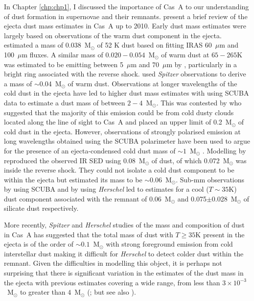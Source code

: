 In Chapter \ref{chp:chp1}, I discussed the importance of Cas~A to our understanding of dust formation in supernovae and their remnants.  \citet{Barlow2010} present a brief review of the ejecta dust mass estimates in Cas~A up to 2010.  Early dust mass estimates were largely based on observations of the warm dust component in the ejecta.  \citet{Arendt1999} estimated a mass of 0.038~M$_{\odot}$ of 52 K dust based on fitting IRAS 60~$\mu$m and 100~$\mu$m fluxes.  A similar mass of $0.020-0.054$~M$_{\odot}$ of warm dust at $65-265$K was estimated to be emitting between 5~$\mu$m and 70~$\mu$m by \citet{Rho2008}, particularly in a bright ring associated with the reverse shock.   \citet{Arendt2014} used {\em Spitzer} observations to derive a  mass of $\sim$0.04~M$_{\odot}$ of warm dust.  Observations at longer wavelengths of the cold dust in the ejecta have led to higher dust mass estimates with \citet{Dunne2003} using SCUBA data to estimate a dust mass of between $2-4$~M$_{\odot}$.  This was contested by \citet{Krause2004} who suggested that the majority of this emission could be from cold dusty clouds located along the line of sight to Cas~A and placed an upper limit of 0.2~M$_{\odot}$ of cold dust in the ejecta.  However, observations of strongly polarised emission at long wavelengths obtained using the SCUBA polarimeter have been used to argue for the presence of an ejecta-condensed cold dust mass of $\sim1$~M$_{\odot}$ \citep{Dunne2009}.  Modelling by \citet{Nozawa2010}  reproduced the observed IR SED using 0.08~M$_{\odot}$ of dust, of which 0.072~M$_{\odot}$ was inside the reverse shock.  They could not isolate a cold dust component to be within the ejecta but estimated its mass to be $\sim0.06$~M$_{\odot}$.  Sub-mm observations by \citet{Sibthorpe2010} using SCUBA and by \citet{Barlow2010} using {\em Herschel} led to estimates for a cool ($T\sim35$K)  dust component associated with the remnant of 0.06~M$_{\odot}$ and 0.075$\pm$0.028~M$_{\odot}$ of silicate dust respectively. 

More recently, {\em Spitzer} and {\em Herschel} studies of the mass and composition of dust in Cas~A has suggested that the total  mass of dust with $T\geqslant35$K present in the ejecta is of the order of $\sim0.1$~M$_{\odot}$ \citep{Barlow2010,Nozawa2010,Arendt2014} with strong foreground emission from cold interstellar dust making it difficult for {\em Herschel} to detect colder dust within the remnant.  Given the difficulties in modelling this object, it is perhaps not surprising that there is significant variation in the estimates of the dust mass in the ejecta with previous estimates covering a wide range, from less than $3\times10^{-3}$~M$_{\odot}$ \citep{Dwek2004} to greater than $4$~M$_{\odot}$ (\citealt{Dunne2003,Dunne2009}; but see also \citealt{Krause2004}).  



